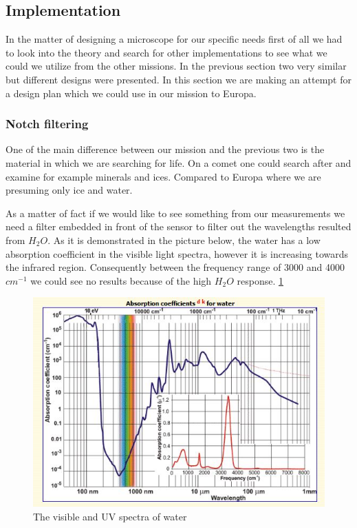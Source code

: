 \subsection{Implementation}
In the matter of designing a microscope for our specific needs first of all we had to look into the theory and search for other implementations to see what we could we utilize from the other missions. In the previous section two very similar but different designs were presented. In this section we are making an attempt for a design plan which we could use in our mission to Europa.

\subsubsection{Notch filtering}

One of the main difference between our mission and the previous two is the material in which we are searching for life. On a comet one could search after and examine for example minerals and ices. Compared to Europa where we are presuming only ice and water.

As a matter of fact if we would like to see something from our measurements we need a filter embedded in front of the sensor to filter out the wavelengths resulted from $H_2O$. As it is demonstrated in the picture below, the water has a low absorption coefficient in the visible light spectra, however it is increasing towards the infrared region. Consequently between the frequency range of 3000 and 4000 $cm^{-1}$ we could see no results because of the high $H_2O$ response.
\ref{fig:Absorption_coeff_water}

\begin{figure}[htb]
  \centering
  \includegraphics[scale=0.7]{figures/BFfig/Absorption_coeff_water}
  \caption{The visible and UV spectra of water}
  \label{fig:Absorption_coeff_water}
\end{figure}

